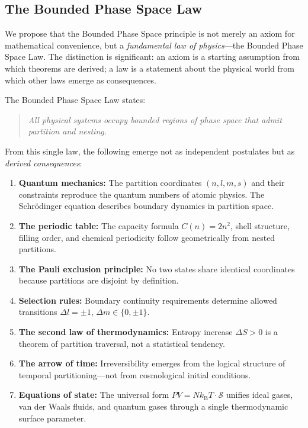 \documentclass[twocolumn,10pt,a4paper]{article}
\theoremstyle{definition}
\theoremstyle{remark}
\newcommand{\kB}{k_{\mathrm{B}}}
\begin{document}
\subsection{The Bounded Phase Space Law}

We propose that the Bounded Phase Space principle is not merely an axiom for mathematical convenience, but a \emph{fundamental law of physics}---the Bounded Phase Space Law. The distinction is significant: an axiom is a starting assumption from which theorems are derived; a law is a statement about the physical world from which other laws emerge as consequences.

The Bounded Phase Space Law states:
\begin{quote}
\emph{All physical systems occupy bounded regions of phase space that admit partition and nesting.}
\end{quote}

From this single law, the following emerge not as independent postulates but as \emph{derived consequences}:

\begin{enumerate}
    \item \textbf{Quantum mechanics:} The partition coordinates $(n, l, m, s)$ and their constraints reproduce the quantum numbers of atomic physics. The Schr\"{o}dinger equation describes boundary dynamics in partition space.

    \item \textbf{The periodic table:} The capacity formula $C(n) = 2n^2$, shell structure, filling order, and chemical periodicity follow geometrically from nested partitions.

    \item \textbf{The Pauli exclusion principle:} No two states share identical coordinates because partitions are disjoint by definition.

    \item \textbf{Selection rules:} Boundary continuity requirements determine allowed transitions $\Delta l = \pm 1$, $\Delta m \in \{0, \pm 1\}$.

    \item \textbf{The second law of thermodynamics:} Entropy increase $\Delta S > 0$ is a theorem of partition traversal, not a statistical tendency.

    \item \textbf{The arrow of time:} Irreversibility emerges from the logical structure of temporal partitioning---not from cosmological initial conditions.

    \item \textbf{Equations of state:} The universal form $PV = N\kB T \cdot \mathcal{S}$ unifies ideal gases, van der Waals fluids, and quantum gases through a single thermodynamic surface parameter.
\end{enumerate}
\end{document}
